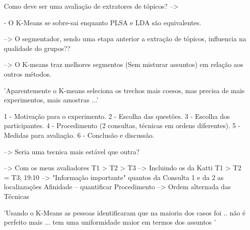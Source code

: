 Como deve ser uma avaliação de extratores de tópicos? --> 









 - O K-Means se sobre-sai enquanto PLSA e LDA são equivalentes.


--> O segmentador, sendo uma etapa anterior a extração de tópicos, influencia na qualidade do grupos??

--> O K-means traz melhores segmentos (Sem misturar assuntos) em relação aos outros métodos.


'Aparentemente o K-means seleciona os trechos mais coesos, mas precisa de mais experimentos, mais amostras ...'




 1 - Motivação para o experimento.
 2 - Escolha das questões.
 3 - Escolha dos participantes.
 4 - Procedimento (2 consultas, técnicas em ordens diferentes).
 5 - Medidas para avaliação.
 6 - Conclusão e discussão.



--> Seria uma tecnica mais estável que  outra? 


--> Com os meus avaliadores T1 > T2 > T3
--> Incluindo os da Katti   T1 > T2 = T3;
19:10 --> "Informação importante"
quantos da Consulta 1 e da 2
as localiazações
Afinidade -- quantificar
Procedimento --> Ordem alternada das Técnicas






'Usando o K-Means as pessoas identificaram que na maioria dos casos foi .. não é perfeito mais ... tem uma uniformidade maior em termos dos assuntos '













